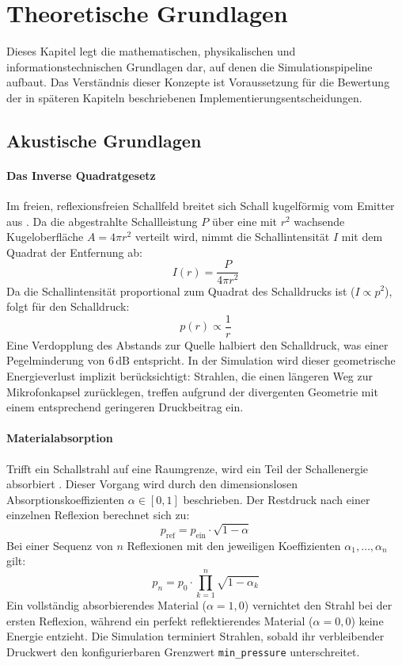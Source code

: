 \section{Theoretische Grundlagen}
\label{sec:grundlagen}

Dieses Kapitel legt die mathematischen, physikalischen und informationstechnischen Grundlagen dar, auf denen die Simulationspipeline aufbaut.
Das Verständnis dieser Konzepte ist Voraussetzung für die Bewertung der in späteren Kapiteln beschriebenen Implementierungsentscheidungen.

\subsection{Akustische Grundlagen}
\label{subsec:akustik}

\paragraph{Das Inverse Quadratgesetz}

Im freien, reflexionsfreien Schallfeld breitet sich Schall kugelförmig vom Emitter aus \parencite{kuttruff2016}.
Da die abgestrahlte Schallleistung $P$ über eine mit $r^2$ wachsende Kugeloberfläche
$A = 4\pi r^2$ verteilt wird, nimmt die Schallintensität $I$ mit dem Quadrat der Entfernung ab:
\[I(r) = \frac{P}{4\pi r^2}\]
Da die Schallintensität proportional zum Quadrat des Schalldrucks ist ($I \propto p^2$), folgt für den Schalldruck:
\[p(r) \propto \frac{1}{r}\]
Eine Verdopplung des Abstands zur Quelle halbiert den Schalldruck, was einer Pegelminderung von $6\,\text{dB}$ entspricht.
In der Simulation wird dieser geometrische Energieverlust implizit berücksichtigt:
Strahlen, die einen längeren Weg zur Mikrofonkapsel zurücklegen, treffen aufgrund der divergenten Geometrie mit einem entsprechend geringeren Druckbeitrag ein.

\paragraph{Materialabsorption}

Trifft ein Schallstrahl auf eine Raumgrenze, wird ein Teil der Schallenergie absorbiert \parencite{kuttruff2016}.
Dieser Vorgang wird durch den dimensionslosen Absorptionskoeffizienten $\alpha \in [0{,}1]$ beschrieben. Der Restdruck nach einer einzelnen Reflexion berechnet sich zu:
\[p_{\text{ref}} = p_{\text{ein}} \cdot \sqrt{1 - \alpha}\]
Bei einer Sequenz von $n$ Reflexionen mit den jeweiligen Koeffizienten $\alpha_1, \ldots, \alpha_n$ gilt:
\[p_n = p_0 \cdot \prod_{k=1}^{n}\sqrt{1 - \alpha_k}\]
Ein vollständig absorbierendes Material ($\alpha = 1{,}0$) vernichtet den Strahl bei der ersten Reflexion, während ein perfekt reflektierendes Material ($\alpha = 0{,}0$) keine Energie entzieht. Die Simulation terminiert Strahlen, sobald ihr verbleibender Druckwert den konfigurierbaren Grenzwert \texttt{min\_pressure} unterschreitet.

